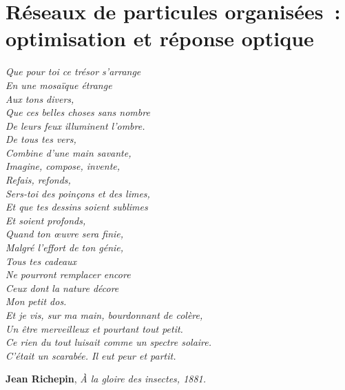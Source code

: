 \documentclass[12pt,french,twoside,openright]{report}
\begin{document}
\chapter{Réseaux de particules organisées~: optimisation et réponse optique}
\begin{flushleft}
\textit{
\og Que pour toi ce trésor s’arrange\\	
En une mosaïque étrange	\\
\hspace{12pt}Aux tons divers,	\\
Que ces belles choses sans nombre	\\
De leurs feux illuminent l’ombre.\\	
\hspace{12pt}De tous tes vers,\\
\vspace{12pt}
Combine d’une main savante,	\\
Imagine, compose, invente,	\\
\hspace{12pt}Refais, refonds,	\\
Sers-toi des poinçons et des limes,	\\
Et que tes dessins soient sublimes	\\
\hspace{12pt}Et soient profonds,\\
\vspace{12pt}
Quand ton œuvre sera finie,	\\
Malgré l’effort de ton génie,	\\
\hspace{12pt}Tous tes cadeaux	\\
Ne pourront remplacer encore	\\
Ceux dont la nature décore	\\
\hspace{12pt}Mon petit dos.\fg [...]\\
\vspace{12pt}
Et je vis, sur ma main, bourdonnant de colère,\\	
Un être merveilleux et pourtant tout petit.	\\
Ce rien du tout luisait comme un spectre solaire.\\	
C’était un scarabée. Il eut peur et partit.}
\end{flushleft}
\begin{flushright}
\textbf{Jean Richepin}, \textit{À la gloire des insectes, 1881.}
\end{flushright}

\end{document}
